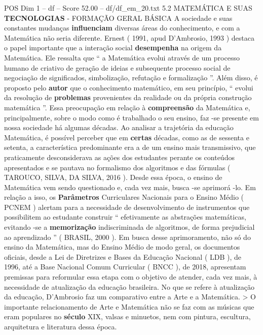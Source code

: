 \begin{textsample}{POS Dim 1 – df – Score 52.00 – df/df\_em\_20.txt}  \label{ex:f1_pos_124}
5.2 MATEMÁTICA E SUAS \textbf{TECNOLOGIAS} - FORMAÇÃO GERAL BÁSICA A sociedade e suas constantes mudanças \textbf{influenciam} diversas áreas do conhecimento, e com a Matemática não seria diferente.
Ernest ( 1991, apud D’Ambrosio, 1993 ) destaca o papel importante que a interação social \textbf{desempenha} na origem da Matemática.
Ele ressalta que “ a Matemática evolui através de um processo humano de criativo de geração de ideias e subsequente processo social de negociação de significados, simbolização, refutação e formalização ”.
Além disso, é proposto pelo \textbf{autor} que o conhecimento matemático, em seu princípio, “ evolui da resolução de \textbf{problemas} provenientes da realidade ou da própria construção matemática ”.
Essa preocupação em relação à \textbf{compreensão} da Matemática e, principalmente, sobre o modo como é trabalhado o seu ensino, faz -se presente em nossa sociedade há algumas décadas.
Ao analisar a trajetória da educação Matemática, é possível perceber que em \textbf{certas} décadas, como as de sessenta e setenta, a característica predominante era a de um ensino mais transmissivo, que praticamente desconsiderava as ações dos estudantes perante os conteúdos apresentados e se pautava no formalismo dos algoritmos e das fórmulas ( TAROUCO, SILVA, DA SILVA, 2016 ).
Desde essa época, o ensino de Matemática vem sendo questionado e, cada vez mais, busca -se aprimorá -lo.
Em relação a isso, os \textbf{Parâmetros} Curriculares Nacionais para o Ensino Médio ( PCNEM ) alertam para a necessidade de desenvolvimento de instrumentos que possibilitem ao estudante construir “ efetivamente as abstrações matemáticas, evitando -se a \textbf{memorização} indiscriminada de algoritmos, de forma prejudicial ao aprendizado ” ( BRASIL, 2000 ).
Em busca desse aprimoramento, não só do ensino da Matemática, mas do Ensino Médio de modo geral, os documentos oficiais, desde a Lei de Diretrizes e Bases da Educação Nacional ( LDB ), de 1996, até a Base Nacional Comum Curricular ( BNCC ), de 2018, apresentam premissas para reformular essa etapa com o objetivo de atender, cada vez mais, à necessidade de atualização da educação brasileira.
No que se refere à atualização da educação, D’Ambrosio faz um comparativo entre a Arte e a Matemática. > O importante relacionamento de Arte e Matemática não se faz com as músicas que eram populares no \textbf{século} XIX, valsas e minuetos, nem com pintura, escultura, arquitetura e literatura dessa época.

\end{textsample}
